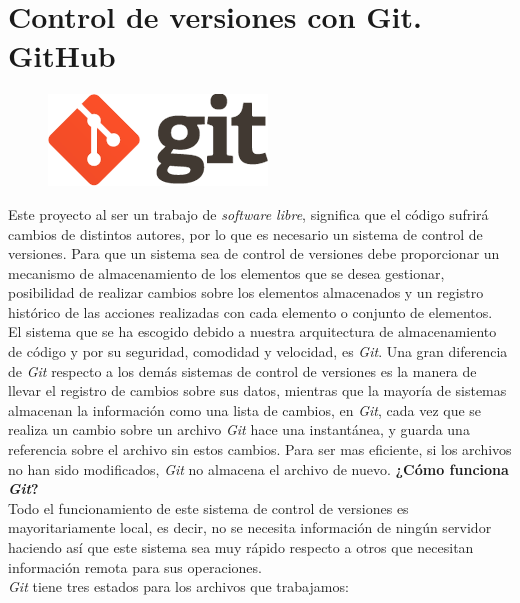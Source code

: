 \documentclass[a4paper, 12pt]{book}
\begin{document}
\section{Control de versiones con Git. GitHub}
\label{sec:git}
\begin{figure}[h]
    \centering
    \includegraphics[scale=0.7]{img/logo_git.png}
    \label{fig:logoGit}
\end{figure}
Este proyecto al ser un trabajo de \emph{software libre}, significa que el código sufrirá cambios de distintos autores, por lo que es necesario un sistema de control de versiones. Para que un sistema sea de control de versiones debe proporcionar un mecanismo de almacenamiento de los elementos que se desea gestionar, posibilidad de realizar cambios sobre los elementos almacenados y un registro histórico de las acciones realizadas con cada elemento o conjunto de elementos. \\
El sistema que se ha escogido debido a nuestra arquitectura de almacenamiento de código y por su seguridad, comodidad y velocidad, es \emph{Git}. Una gran diferencia de \emph{Git} respecto a los demás sistemas de control de versiones es la manera de llevar el registro de cambios sobre sus datos, mientras que la mayoría de sistemas almacenan la información como una lista de cambios, en \emph{Git}, cada vez que se realiza un cambio sobre un archivo \emph{Git} hace una instantánea, y guarda una referencia sobre el archivo sin estos cambios. Para ser mas eficiente, si los archivos no han sido modificados, \emph{Git} no almacena el archivo de nuevo. %
\textbf{¿Cómo funciona \emph{Git}?}\\
Todo el funcionamiento de este sistema de control de versiones es mayoritariamente local, es decir, no se necesita información de ningún servidor haciendo así que este sistema sea muy rápido respecto a otros que necesitan información remota para sus operaciones. \\
\emph{Git} tiene tres estados para los archivos que trabajamos:
\end{document}
